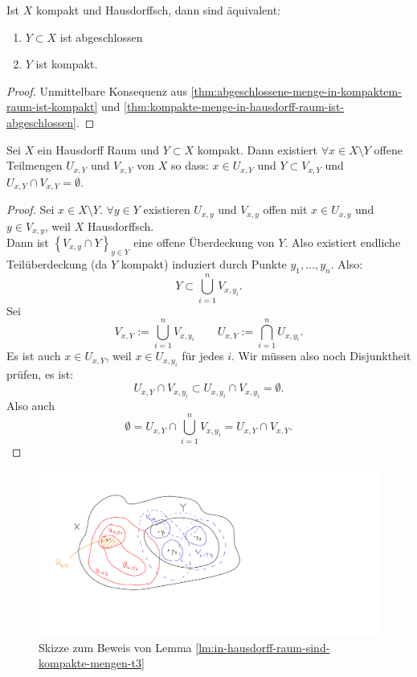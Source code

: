 \begin{corollary*}\label{cor:abgeschlossen-gdw-kompakt-in-kompaktem-hausdorff-raum}
    Ist $X$ kompakt und Hausdorffsch, dann sind äquivalent:
\begin{enumerate}[1)]
        \item $Y\subset X$ ist abgeschlossen
        \item $Y$ ist kompakt.
    \end{enumerate}
\end{corollary*}
\begin{proof}
    Unmittelbare Konsequenz aus \autoref{thm:abgeschlossene-menge-in-kompaktem-raum-ist-kompakt} und \autoref{thm:kompakte-menge-in-hausdorff-raum-ist-abgeschlossen}.
\end{proof}
\begin{lemma}\label{lm:in-hausdorff-raum-sind-kompakte-mengen-t3}
    Sei $X$ ein Hausdorff Raum und  $Y\subset X$ kompakt. Dann existiert $\forall x\in X\setminus Y$ offene Teilmengen $U_{x,Y}$ und $V_{x,Y}$ von $X$ so dass:  $x\in U_{x,Y}$ und $Y\subset V_{x,Y}$ und $U_{x,Y} \cap V_{x,Y} = \emptyset$.
\end{lemma}
\begin{proof}
    Sei $x\in X\setminus Y$. $\forall y\in Y$ existieren $U_{x,y}$ und $V_{x,y}$ offen mit $x\in U_{x,y}$ und $y\in V_{x,y}$, weil $X$ Hausdorffsch. \\
    Dann ist  $\left \{V_{x,y} \cap Y\right\} _{y\in Y}$ eine offene Überdeckung von $Y$. Also existiert endliche Teilüberdeckung (da  $Y$ kompakt) induziert durch Punkte  $y_1,\ldots,y_n$. Also:
    \[
    Y\subset \bigcup_{i=1}^n V_{x,y_i}
    .\] 
    Sei
    \[
    V_{x,Y} := \bigcup_{i=1}^n V_{x,y_i} \qquad U_{x,Y} := \bigcap_{i=1}^n U_{x,y_i} 
    .\] 
    Es ist auch $x\in U_{x,Y}$, weil $x\in U_{x,y_i}$ für jedes $i$. Wir müssen also noch Disjunktheit prüfen, es ist:
     \[
    U_{x,Y} \cap V_{x,y_i} \subset U_{x,y_i} \cap V_{x,y_i} = \emptyset
    .\] 
    Also auch
    \[
        \emptyset=    U_{x,Y} \cap \bigcup_{i=1}^n V_{x,y_i} = U_{x,Y} \cap V_{x,Y}
    .\]
\end{proof}
    \begin{figure}[H]
    \includegraphics[scale=0.4]{figures/Lemma5.5.pdf}
    \caption{Skizze zum Beweis von Lemma \ref{lm:in-hausdorff-raum-sind-kompakte-mengen-t3}}
\end{figure}
